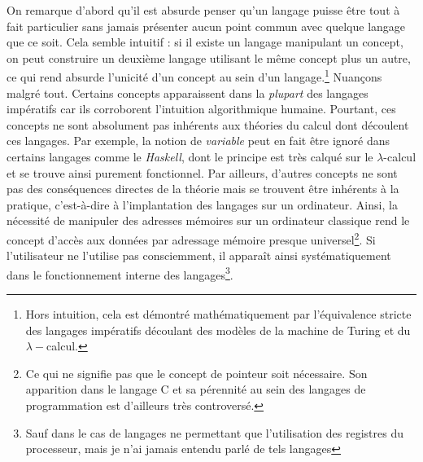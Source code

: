 \documentclass[../../main.tex]{subfiles}
\begin{document}
On remarque d'abord qu'il est absurde penser qu'un langage puisse être tout à fait particulier sans jamais présenter aucun point commun avec quelque langage que ce soit. Cela semble intuitif : si il existe un langage manipulant un concept, on peut construire un deuxième langage utilisant le même concept plus un autre, ce qui rend absurde l'unicité d'un concept au sein d'un langage.\footnote{Hors intuition, cela est démontré mathématiquement par l'équivalence stricte des langages impératifs découlant des modèles de la machine de Turing et du $\lambda-$calcul.}\newline
Nuançons malgré tout. Certains concepts apparaissent dans la \textit{plupart} des langages impératifs car ils corroborent l'intuition algorithmique humaine. Pourtant, ces concepts ne sont absolument pas inhérents aux théories du calcul dont découlent ces langages. Par exemple, la notion de \textit{variable} peut en fait être ignoré dans certains langages comme le \textit{Haskell}, dont le principe est très calqué sur le $\lambda$-calcul et se trouve ainsi purement fonctionnel. Par ailleurs, d'autres concepts ne sont pas des conséquences directes de la théorie mais se trouvent être inhérents à la pratique, c'est-à-dire à l'implantation des langages sur un ordinateur. Ainsi, la nécessité de manipuler des adresses mémoires sur un ordinateur classique rend le concept d'accès aux données par adressage mémoire presque universel\footnote{Ce qui ne signifie pas que le concept de pointeur soit nécessaire. Son apparition dans le langage C et sa pérennité au sein des langages de programmation est d'ailleurs très controversé.}. Si l'utilisateur ne l'utilise pas consciemment, il apparaît ainsi systématiquement dans le fonctionnement interne des langages\footnote{Sauf dans le cas de langages ne permettant que l'utilisation des registres du processeur, mais je n'ai jamais entendu parlé de tels langages}.

\hrulefill
\newpage
\end{document}
